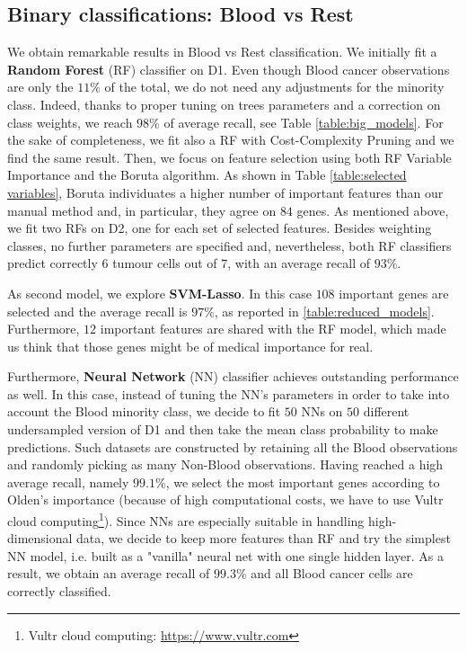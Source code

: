 \documentclass[a4paper,11pt, oneside]{article}  %
\begin{document}
\subsection{Binary classifications: Blood vs Rest}
We obtain remarkable results in Blood vs Rest classification. We initially fit a \textbf{Random Forest} (RF) classifier on D1. Even though Blood cancer observations are only the $11\%$ of the total,  we do not need any adjustments for the minority class.  Indeed, thanks to proper tuning on trees parameters and a correction on class weights, we reach $98\%$ of average recall,  see Table \ref{table:big_models}. For the sake of completeness, we fit also a RF with Cost-Complexity Pruning and we find the same result. Then,  we focus on feature selection using both RF Variable Importance and the Boruta algorithm. As shown in Table \ref{table:selected variables},  Boruta individuates a higher number of important features than our manual method and,  in particular,  they agree on $84$ genes. As mentioned above,  we fit two RFs on D2, one for each set of selected features. Besides weighting classes, no further parameters are specified and, nevertheless, both RF classifiers predict correctly $6$ tumour cells out of $7$,  with an average recall of $93\%$.

As second model, we explore \textbf{SVM-Lasso}. In this case $108$ important genes are selected and the average recall is $97\%$, as reported in \ref{table:reduced_models}. Furthermore, $12$ important features are shared with the RF model, which made us think that those genes might be of medical importance for real.

Furthermore, \textbf{Neural Network} (NN) classifier achieves outstanding performance as well.  In this case,  instead of tuning the NN's parameters in order to take into account the Blood minority class,  we decide to fit $50$ NNs on $50$ different undersampled version of D1 and then take the mean class probability to make predictions. Such datasets are constructed by retaining all the Blood observations and randomly picking as many Non-Blood observations.  Having reached a high average recall, namely $99.1\%$,  we select the most important genes according to Olden's importance (because of high computational costs, we have to use Vultr cloud computing\footnote{Vultr cloud computing: \url{https://www.vultr.com}}). Since NNs are especially suitable in handling high-dimensional data, we decide to keep more features than RF and try the simplest NN model,  i.e.  built as a "vanilla" neural net with one single hidden layer.  As a result, we obtain an average recall of $99.3\%$ and all Blood cancer cells are correctly classified. 
\end{document}
